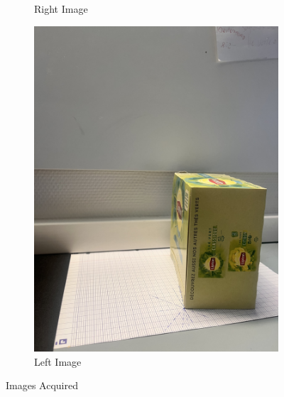 \documentclass[12pt, twoside]{report}
\begin{document}
\begin{enumerate}
\begin{figure}[H]
\begin{subfigure}[b]{0.4\textwidth}
             \caption{Right Image}
         \label{fig:fig_rigth}
     \end{subfigure}
     \hfill
     \begin{subfigure}[b]{0.4\textwidth}
         \centering
         \includegraphics[width=\textwidth]{images/tp_3/img2r.jpg}
         \caption{Left Image}
         \label{fig:fig_left}
     \end{subfigure}
     
     \hfill 
        \caption{Images Acquired}
        \label{fig:im_tp3}
\end{figure}




\end{enumerate}
\end{document}
